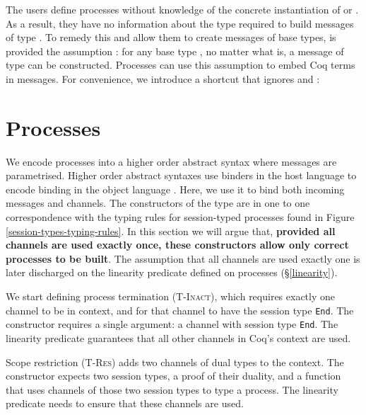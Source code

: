 \documentclass{mproj}
\newcommand{\type}{\texttt}
\newcommand{\End}{\type{End}}
\begin{document}
The users define processes without knowledge of the concrete instantiation of  or . As a result, they have no information about the type  required to build messages of type . To remedy this and allow them to create messages of base types,  is provided the assumption : for any base type , no matter what  is, a message of type  can be constructed. Processes can use this assumption to embed Coq terms in messages. For convenience, we introduce a shortcut that ignores  and :


\section{Processes}\label{processes}

We encode processes into a higher order abstract syntax where messages are parametrised. Higher order abstract syntaxes use binders in the host language to encode binding in the object language \cite{Chlipala2008}. Here, we use it to bind both incoming messages and channels. The constructors of the  type are in one to one correspondence with the typing rules for session-typed processes found in Figure \ref{session-types-typing-rules}. In this section we will argue that, \textbf{provided all channels are used exactly once, these constructors allow only correct processes to be built}. The assumption that all channels are used exactly one is later discharged on the linearity predicate defined on processes (\S \ref{linearity}).

We start defining process termination (\textsc{T-Inact}), which requires exactly one channel to be in context, and for that channel to have the session type \End. The constructor  requires a single argument: a channel with session type \End. The linearity predicate guarantees that all other channels in Coq's context are used.


Scope restriction (\textsc{T-Res}) adds two channels of dual types to the context. The constructor  expects two session types, a proof of their duality, and a function that uses channels of those two session types to type a process. The linearity predicate needs to ensure that these channels are used.
\end{document}
